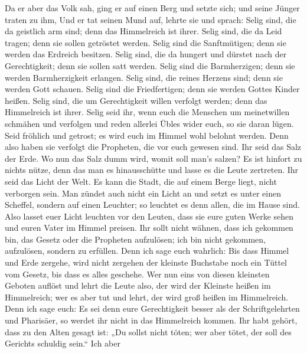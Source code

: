  Da er aber das Volk sah, ging er auf einen Berg und
setzte sich; und seine Jünger traten zu ihm,  Und er tat
seinen Mund auf, lehrte sie und sprach:  Selig sind, die
da geistlich arm sind; denn das Himmelreich ist ihrer. 
Selig sind, die da Leid tragen; denn sie sollen getröstet werden.
 Selig sind die Sanftmütigen; denn sie werden das Erdreich
besitzen.  Selig sind, die da hungert und dürstet nach der
Gerechtigkeit; denn sie sollen satt werden.  Selig sind
die Barmherzigen; denn sie werden Barmherzigkeit erlangen.
 Selig sind, die reines Herzens sind; denn sie werden Gott
schauen.  Selig sind die Friedfertigen; denn sie werden
Gottes Kinder heißen.  Selig sind, die um Gerechtigkeit
willen verfolgt werden; denn das Himmelreich ist ihrer. 
Selig seid ihr, wenn euch die Menschen um meinetwillen schmähen und
verfolgen und reden allerlei Übles wider euch, so sie daran lügen.
 Seid fröhlich und getrost; es wird euch im Himmel wohl
belohnt werden. Denn also haben sie verfolgt die Propheten, die vor euch
gewesen sind.  Ihr seid das Salz der Erde. Wo nun das
Salz dumm wird, womit soll man's salzen? Es ist hinfort zu nichts nütze,
denn das man es hinausschütte und lasse es die Leute zertreten.
 Ihr seid das Licht der Welt. Es kann die Stadt, die auf
einem Berge liegt, nicht verborgen sein.  Man zündet auch
nicht ein Licht an und setzt es unter einen Scheffel, sondern auf einen
Leuchter; so leuchtet es denn allen, die im Hause sind. 
Also lasset euer Licht leuchten vor den Leuten, dass sie eure guten
Werke sehen und euren Vater im Himmel preisen.  Ihr sollt
nicht wähnen, dass ich gekommen bin, das Gesetz oder die Propheten
aufzulösen; ich bin nicht gekommen, aufzulösen, sondern zu erfüllen.
 Denn ich sage euch wahrlich: Bis dass Himmel und Erde
zergehe, wird nicht zergehen der kleinste Buchstabe noch ein Tüttel vom
Gesetz, bis dass es alles geschehe.  Wer nun eins von
diesen kleinsten Geboten auflöst und lehrt die Leute also, der wird der
Kleinste heißen im Himmelreich; wer es aber tut und lehrt, der wird groß
heißen im Himmelreich.  Denn ich sage euch: Es sei denn
eure Gerechtigkeit besser als der Schriftgelehrten und Pharisäer, so
werdet ihr nicht in das Himmelreich kommen.  Ihr habt
gehört, dass zu den Alten gesagt ist: „Du sollst nicht töten; wer aber
tötet, der soll des Gerichts schuldig sein.``  Ich aber

